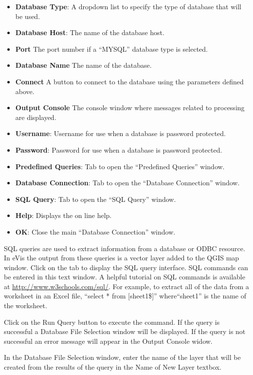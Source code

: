 \begin{itemize}
\item \textbf{Database Type}: A dropdown list to specify the type of database that will be used.
\item \textbf{Database Host}: The name of the database host.
\item \textbf{Port} The port number if a ``MYSQL'' database type is selected.
\item \textbf{Database Name} The name of the database.
\item \textbf{Connect} A button to connect to the database using the parameters defined above.
\item \textbf{Output Console} The console window where messages related to processing are
displayed.
\item \textbf{Username}: Username for use when a database is password protected.
\item \textbf{Password}: Password for use when a database is password protected.
\item \textbf{Predefined Queries}: Tab to open the ``Predefined Queries'' window.
\item \textbf{Database Connection}: Tab to open the ``Database Connection'' window.
\item \textbf{SQL Query}: Tab to open the ``SQL Query'' window.
\item \textbf{Help}: Displays the on line help.
\item \textbf{OK}: Close the main ``Database Connection'' window.
\end{itemize}

\label{evis_running_sql}

SQL queries are used to extract information from a database or ODBC resource. In eVis the output
from these queries is a vector layer added to the QGIS map window. Click on the  tab
to display the SQL query interface. SQL commands can be entered in this text window. A helpful
tutorial on SQL commands is available at \url{http://www.w3schools.com/sql/}. For example, to
extract all of the data from a worksheet in an Excel file, ``select * from [sheet1\$]''
where``sheet1'' is the name of the worksheet.

Click on the Run Query button to execute the command. If the query is successful a Database File
Selection window will be displayed. If the query is not successful an error message will appear in
the Output Console widow.

In the Database File Selection window, enter the name of the layer that will be created from the
results of the query in the Name of New Layer textbox.

